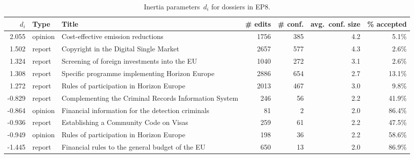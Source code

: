 


\begin{sidewaystable}
  \centering
  \caption{Inertia parameters~$d_i$ for dossiers in EP8.}
  \label{lmp:tab:inertia_params}
  \begin{tabular}{rllrrrr}
    \toprule
    $d_i$ & Type & Title & \# edits & \# conf. & avg.\ conf. size & \% accepted \\
    \midrule

    2.055 & opinion & Cost-effective emission reductions             & 1756 & 385 & 4.2 & 5.1\% \\
    1.502 & report  & Copyright in the Digital Single Market         & 2657 & 577 & 4.3 & 2.6\% \\
    1.324 & report  & Screening of foreign investments into the EU   & 1040 & 272 & 3.1 & 2.6\% \\
    1.308 & report  & Specific programme implementing Horizon Europe & 2886 & 654 & 2.7 & 13.1\% \\
    1.272 & report  & Rules of participation in Horizon Europe       & 2013 & 467 & 3.0 & 9.8\% \\

    \midrule

    -0.829 & report  & Complementing the Criminal Records Information System & 246 & 56 & 2.2 & 41.9\% \\
    -0.864 & opinion & Financial information for the detection criminals     & 81  & 2  & 2.0 & 86.4\% \\
    -0.936 & report  & Establishing a Community Code on Visas                & 259 & 61 & 2.2 & 47.5\% \\
    -0.949 & opinion & Rules of participation in Horizon Europe              & 198 & 36 & 2.2 & 58.6\% \\
    -1.445 & report  & Financial rules to the general budget of the EU       & 650 & 13 & 2.0 & 86.9\% \\

    \bottomrule
  \end{tabular}
\end{sidewaystable}

